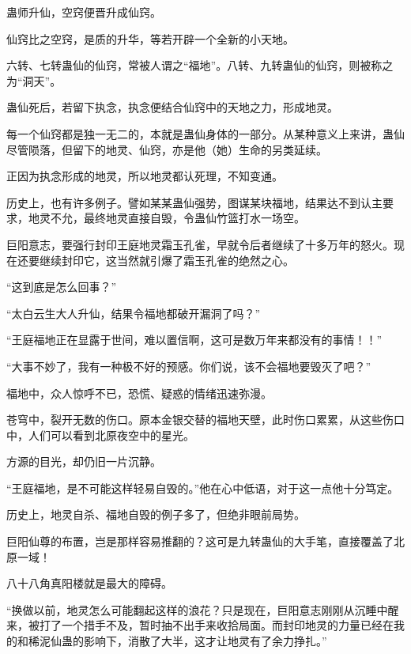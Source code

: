 
\begin{this_body}



蛊师升仙，空窍便晋升成仙窍。

仙窍比之空窍，是质的升华，等若开辟一个全新的小天地。

六转、七转蛊仙的仙窍，常被人谓之“福地”。八转、九转蛊仙的仙窍，则被称之为“洞天”。

蛊仙死后，若留下执念，执念便结合仙窍中的天地之力，形成地灵。

每一个仙窍都是独一无二的，本就是蛊仙身体的一部分。从某种意义上来讲，蛊仙尽管陨落，但留下的地灵、仙窍，亦是他（她）生命的另类延续。

正因为执念形成的地灵，所以地灵都认死理，不知变通。

历史上，也有许多例子。譬如某某蛊仙强势，图谋某块福地，结果达不到认主要求，地灵不允，最终地灵直接自毁，令蛊仙竹篮打水一场空。

巨阳意志，要强行封印王庭地灵霜玉孔雀，早就令后者继续了十多万年的怒火。现在还要继续封印它，这当然就引爆了霜玉孔雀的绝然之心。

“这到底是怎么回事？”

“太白云生大人升仙，结果令福地都破开漏洞了吗？”

“王庭福地正在显露于世间，难以置信啊，这可是数万年来都没有的事情！！”

“大事不妙了，我有一种极不好的预感。你们说，该不会福地要毁灭了吧？”

福地中，众人惊呼不已，恐慌、疑惑的情绪迅速弥漫。

苍穹中，裂开无数的伤口。原本金银交替的福地天壁，此时伤口累累，从这些伤口中，人们可以看到北原夜空中的星光。

方源的目光，却仍旧一片沉静。

“王庭福地，是不可能这样轻易自毁的。”他在心中低语，对于这一点他十分笃定。

历史上，地灵自杀、福地自毁的例子多了，但绝非眼前局势。

巨阳仙尊的布置，岂是那样容易推翻的？这可是九转蛊仙的大手笔，直接覆盖了北原一域！

八十八角真阳楼就是最大的障碍。

“换做以前，地灵怎么可能翻起这样的浪花？只是现在，巨阳意志刚刚从沉睡中醒来，被打了一个措手不及，暂时抽不出手来收拾局面。而封印地灵的力量已经在我的和稀泥仙蛊的影响下，消散了大半，这才让地灵有了余力挣扎。”


\end{this_body}
